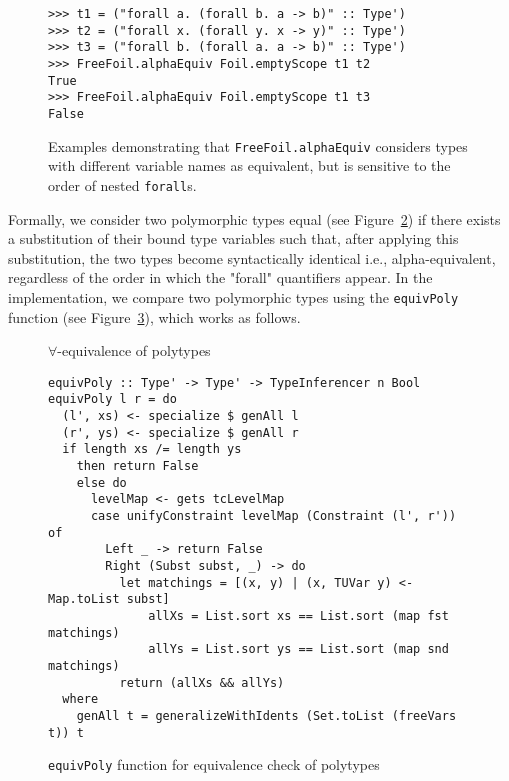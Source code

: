 \begin{figure}[H]
  \begin{verbatim}
>>> t1 = ("forall a. (forall b. a -> b)" :: Type')
>>> t2 = ("forall x. (forall y. x -> y)" :: Type')
>>> t3 = ("forall b. (forall a. a -> b)" :: Type')
>>> FreeFoil.alphaEquiv Foil.emptyScope t1 t2
True
>>> FreeFoil.alphaEquiv Foil.emptyScope t1 t3
False
  \end{verbatim}
  \caption[\texttt{FreeFoil.alphaEquiv} usage examples (2)]{Examples demonstrating that \texttt{FreeFoil.alphaEquiv} considers types with different variable names as equivalent, but is sensitive to the order of nested \texttt{forall}s.}
  \label{fig:freefoil-alphaequiv-foralls}
\end{figure}

Formally, we consider two polymorphic types equal (see Figure~\ref{fig:equiv-poly-rule}) if there exists a substitution of their bound type variables such that, after applying this substitution, the two types become syntactically identical i.e., alpha-equivalent, regardless of the order in which the "forall" quantifiers appear. In the implementation, we compare two polymorphic types using the \texttt{equivPoly} function (see Figure~\ref{fig:equiv-poly-impl}), which works as follows.

\begin{figure}[H]
  \begin{prooftree*}
  \end{prooftree*}
  \caption{$\forall$-equivalence of polytypes}
  \label{fig:equiv-poly-rule}
\end{figure}

\begin{figure}[H]
  \begin{verbatim}
equivPoly :: Type' -> Type' -> TypeInferencer n Bool
equivPoly l r = do
  (l', xs) <- specialize $ genAll l
  (r', ys) <- specialize $ genAll r
  if length xs /= length ys
    then return False
    else do
      levelMap <- gets tcLevelMap
      case unifyConstraint levelMap (Constraint (l', r')) of
        Left _ -> return False
        Right (Subst subst, _) -> do
          let matchings = [(x, y) | (x, TUVar y) <- Map.toList subst]
              allXs = List.sort xs == List.sort (map fst matchings)
              allYs = List.sort ys == List.sort (map snd matchings)
          return (allXs && allYs)
  where
    genAll t = generalizeWithIdents (Set.toList (freeVars t)) t
  \end{verbatim}
  \caption{\texttt{equivPoly} function for equivalence check of polytypes}
  \label{fig:equiv-poly-impl}
\end{figure}

